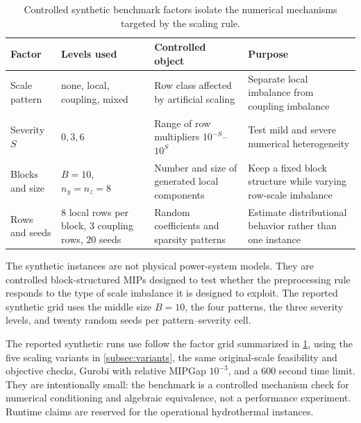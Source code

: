 \documentclass[AMA,Times1COL]{WileyNJDv5} %
\providecommand{\DIFadd}[1]{{\protect\color{blue} \sf #1}} %
\providecommand{\DIFdel}[1]{{\protect\color{red} \scriptsize #1}} %
\providecommand{\DIFaddbegin}{} %
\providecommand{\DIFaddend}{} %
\providecommand{\DIFdelbegin}{} %
\providecommand{\DIFdelend}{} %
\begin{document}
\begin{table}[t]
\centering
\caption{Controlled synthetic benchmark factors isolate the numerical mechanisms targeted by the scaling rule.}
\label{tab:synthetic-design}
\begin{threeparttable}
\small
\begin{tabular}{@{}p{}p{}p{}p{}@{}}
\toprule
Factor & Levels used & Controlled object & Purpose \\
\midrule
Scale pattern & none, local, coupling, mixed
& Row class affected by artificial scaling
& Separate local imbalance from coupling imbalance \\
Severity $S$ & $0,3,6$
& Range of row multipliers $10^{-S}$--$10^S$
& Test mild and severe numerical heterogeneity \\
Blocks and size & $B=10$, $n_y=n_z=8$
& Number and size of generated local components
& Keep a fixed block structure while varying row-scale imbalance \\
Rows and seeds & $8$ local rows per block, $3$ coupling rows, $20$ seeds
& Random coefficients and sparsity patterns
& Estimate distributional behavior rather than one instance \\
\bottomrule
\end{tabular}
\begin{tablenotes}[flushleft]\footnotesize
\item The synthetic instances are not physical power-system models. They are controlled
block-structured MIPs designed to test whether the preprocessing rule responds to the type
of scale imbalance it is designed to exploit. The reported synthetic grid uses the middle
size $B=10$, the four patterns, the three severity levels, and twenty random seeds per
pattern--severity cell.
\end{tablenotes}
\end{threeparttable}
\end{table}

The reported synthetic runs \DIFdelbegin \DIFdel{use }\DIFdelend \DIFaddbegin \DIFadd{follow the factor grid summarized in \cref{tab:synthetic-design},
using }\DIFaddend the five scaling variants in \cref{subsec:variants}, the
same original-scale feasibility and objective checks, Gurobi with relative MIPGap
$10^{-3}$, and a $600$ second time limit. They are intentionally small: the benchmark is a
controlled mechanism check for numerical conditioning and algebraic equivalence, not a
performance experiment. Runtime claims are reserved for the operational hydrothermal
instances.
\end{document}
